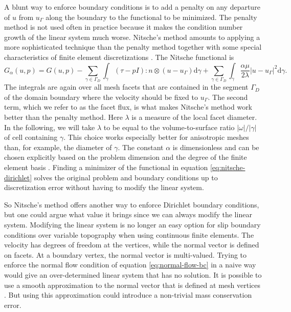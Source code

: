 \documentclass[gmd, manuscript]{copernicus}
\begin{document}
A blunt way to enforce boundary conditions is to add a penalty on any departure of $u$ from $u_\Gamma$ along the boundary to the functional to be minimized.
The penalty method is not used often in practice because it makes the condition number growth of the linear system much worse.
Nitsche's method amounts to applying a more sophisticated technique than the penalty method together with some special characteristics of finite element discretizations \citep{stenberg1995some}.
The Nitsche functional is
\begin{equation}
    G_\alpha(u, p) = G(u, p) - \sum_{\gamma\in\Gamma_D}\int_\gamma(\tau - pI) : n\otimes(u - u_\Gamma)\mathrm d\gamma + \sum_{\gamma\in\Gamma_D}\int_\gamma\frac{\alpha\mu}{2\lambda}|u - u_\Gamma|^2\mathrm d\gamma.
    \label{eq:nitsche-dirichlet}
\end{equation}
The integrals are again over all mesh facets that are contained in the segment $\Gamma_D$ of the domain boundary where the velocity should be fixed to $u_\Gamma$.
The second term, which we refer to as the facet flux, is what makes Nitsche's method work better than the penalty method.
Here $\lambda$ is a measure of the local facet diameter.
In the following, we will take $\lambda$ to be equal to the volume-to-surface ratio $|\omega|/|\gamma|$ of cell containing $\gamma$.
This choice works especially better for anisotropic meshes than, for example, the diameter of $\gamma$.
The constant $\alpha$ is dimensionless and can be chosen explicitly based on the problem dimension and the degree of the finite element basis \citep{warburton2003constants}.
Finding a minimizer of the functional in equation \eqref{eq:nitsche-dirichlet} solves the original problem and boundary conditions up to discretization error without having to modify the linear system.

So Nitsche's method offers another way to enforce Dirichlet boundary conditions, but one could argue what value it brings since we can always modify the linear system.
Modifying the linear system is no longer an easy option for slip boundary conditions over variable topography when using continuous finite elements.
The velocity has degrees of freedom at the vertices, while the normal vector is defined on facets.
At a boundary vertex, the normal vector is multi-valued.
Trying to enforce the normal flow condition of equation \eqref{eq:normal-flow-bc} in a naive way would give an over-determined linear system that has no solution.
It is possible to use a smooth approximation to the normal vector that is defined at mesh vertices \citep{gagliardini2013capabilities}.
But using this approximation could introduce a non-trivial mass conservation error.
\end{document}
